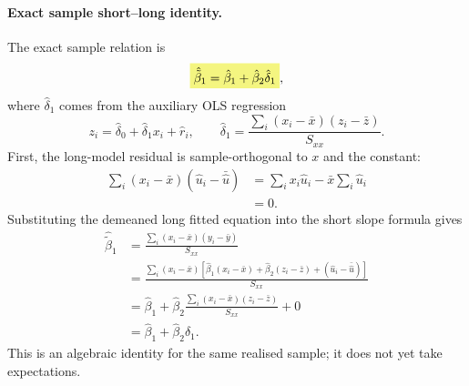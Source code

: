 \paragraph{Exact sample short--long identity.}
The exact sample relation is
\begin{equation}\label{eq:sample-ovb}
\hm{\hat{\tilde\beta}_1=\hat\beta_1+\hat\beta_2\hat\delta_1},
\end{equation}
where $\hat\delta_1$ comes from the auxiliary OLS regression
\[z_i=\hat\delta_0+\hat\delta_1x_i+\hat r_i,
\qquad
\hat\delta_1=\frac{\sum_i(x_i-\bar x)(z_i-\bar z)}{S_{xx}}.
\]
First, the long-model residual is sample-orthogonal to $x$ and the constant:
\begin{align*}
\sum_i(x_i-\bar x)(\hat u_i-\bar{\hat u})
&=\sum_i x_i\hat u_i-\bar x\sum_i\hat u_i\\
&=0.
\end{align*}
Substituting the demeaned long fitted equation into the short slope formula gives
\begin{align*}
\hat{\tilde\beta}_1
&=\frac{\sum_i(x_i-\bar x)(y_i-\bar y)}{S_{xx}}\\
&=\frac{\sum_i(x_i-\bar x)\left[\hat\beta_1(x_i-\bar x)
+\hat\beta_2(z_i-\bar z)+(\hat u_i-\bar{\hat u})\right]}{S_{xx}}\\
&=\hat\beta_1+\hat\beta_2\frac{\sum_i(x_i-\bar x)(z_i-\bar z)}{S_{xx}}+0\\
&=\hat\beta_1+\hat\beta_2\hat\delta_1.
\end{align*}
This is an algebraic identity for the same realised sample; it does not yet take expectations.

